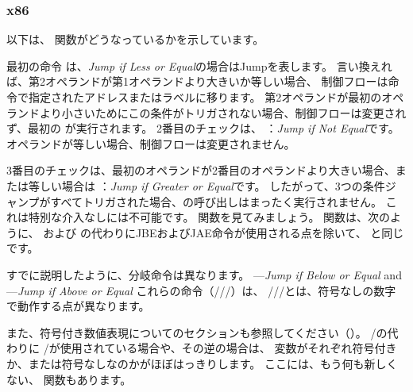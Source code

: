 \subsubsection{x86}


以下は、 関数がどうなっているかを示しています。




最初の命令 \JLE は、\emph{Jump if Less or Equal}の場合はJumpを表します。 
言い換えれば、第2オペランドが第1オペランドより大きいか等しい場合、
制御フローは命令で指定されたアドレスまたはラベルに移ります。 
第2オペランドが最初のオペランドより小さいためにこの条件がトリガされない場合、制御フローは変更されず、最初の \printf が実行されます。 
2番目のチェックは、 \JNE ：\emph{Jump if Not Equal}です。 
オペランドが等しい場合、制御フローは変更されません。

3番目のチェックは、最初のオペランドが2番目のオペランドより大きい場合、または等しい場合は \JGE ：\emph{Jump if Greater or Equal}です。 
したがって、3つの条件ジャンプがすべてトリガされた場合、\printf の呼び出しはまったく実行されません。 
これは特別な介入なしには不可能です。 
関数を見てみましょう。 
関数は、次のように、 \JLE および \JGE の代わりにJBEおよびJAE命令が使用される点を除いて、
と同じです。




すでに説明したように、分岐命令は異なります。
\JBE---\emph{Jump if Below or Equal} and \JAE---\emph{Jump if Above or Equal}
これらの命令（/\JAE/\JB/\JBE）は、 \JG/\JGE/\JL/\JLE とは、符号なしの数字で動作する点が異なります。


また、符号付き数値表現についてのセクションも参照してください（）。 
/\JB の代わりに \JG/\JL が使用されている場合や、その逆の場合は、
変数がそれぞれ符号付きか、または符号なしなのかがほぼはっきりします。
ここには、もう何も新しくない、 \main 関数もあります。

